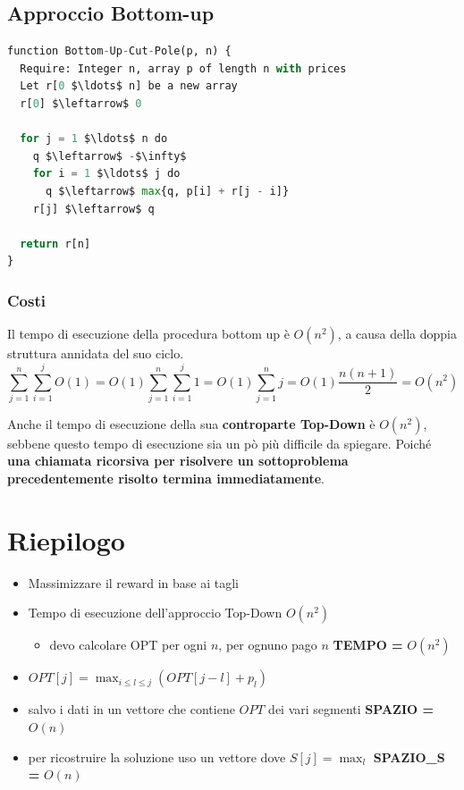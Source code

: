 \subsection{Approccio Bottom-up}

\begin{lstlisting}[language=Python, mathescape=true]
function Bottom-Up-Cut-Pole(p, n) {
  Require: Integer n, array p of length n with prices
  Let r[0 $\ldots$ n] be a new array
  r[0] $\leftarrow$ 0

  for j = 1 $\ldots$ n do
    q $\leftarrow$ -$\infty$
    for i = 1 $\ldots$ j do
      q $\leftarrow$ max{q, p[i] + r[j - i]}
    r[j] $\leftarrow$ q

  return r[n]
}
\end{lstlisting}

\subsubsection{Costi}

Il tempo di esecuzione della procedura bottom up è $O(n^2)$, a causa
della doppia struttura annidata del suo ciclo.
$$
  \sum^n_{j=1} \sum^j_{i=1} O(1) = O(1) \sum^n_{j=1} \sum^j_{i=1} 1 = O(1) \sum^n_{j=1} j = O(1) \frac{n(n+1)}{2} = O(n^2)
$$

Anche il tempo di esecuzione della sua \textbf{controparte Top-Down} è
$O(n^2)$, sebbene questo tempo di esecuzione sia un pò più difficile
da spiegare. Poiché \textbf{una chiamata ricorsiva per risolvere un
  sottoproblema precedentemente risolto termina immediatamente}.
\newpage
\section{Riepilogo}

\begin{itemize}
  \item
        Massimizzare il reward in base ai tagli
  \item
        Tempo di esecuzione dell'approccio Top-Down $O(n^2)$

        \begin{itemize}
          \item
                devo calcolare OPT per ogni $n$, per ognuno pago $n$ \textbf{TEMPO =}
                $O(n^2)$
        \end{itemize}
  \item
        $OPT[j] = \max_{i \le l \le j} (OPT[j-l] + p_l)$
  \item
        salvo i dati in un vettore che contiene $OPT$ dei vari segmenti
        \textbf{SPAZIO =} $O(n)$
  \item
        per ricostruire la soluzione uso un vettore dove $S[j] = \max_l$
        \textbf{SPAZIO\_S =} $O(n)$
\end{itemize}
